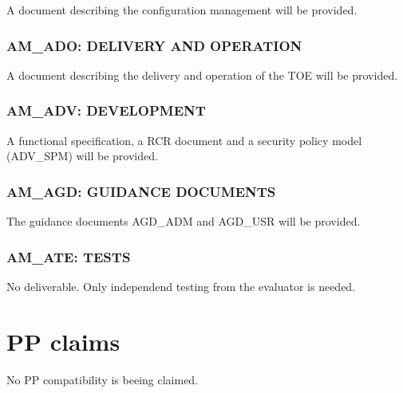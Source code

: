 \documentclass[12pt,english]{scrbook}
\begin{document}
A document describing the configuration management will be provided.





\subsection{AM{\_}ADO: DELIVERY AND OPERATION}

A document describing the delivery and operation of the TOE will be provided.




\subsection{AM{\_}ADV: DEVELOPMENT}

A functional specification,  a RCR document and a security policy model
(ADV\_SPM) will be provided.




\subsection{AM{\_}AGD: GUIDANCE DOCUMENTS}

The guidance documents AGD{\_}ADM and AGD{\_}USR will be provided.





\subsection{AM{\_}ATE: TESTS}

No deliverable. Only independend testing from the evaluator is needed.





\chapter{PP claims}

No PP compatibility is beeing claimed.
\end{document}
